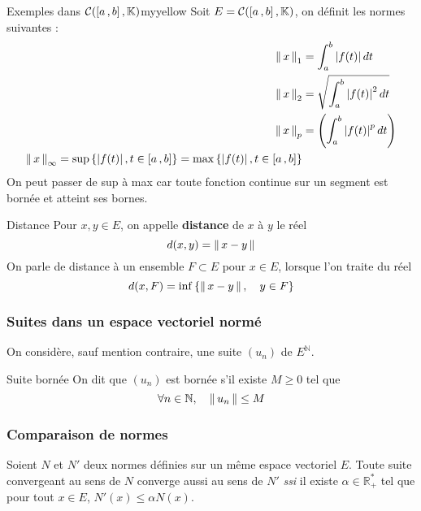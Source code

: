     \begin{omed}{Exemples dans $\mathcal{C}(\intervalleFF{a}{b},\mathbb{K})$}{myyellow}
        Soit $E = \mathcal{C}(\intervalleFF{a}{b}, \mathbb{K})$, on définit les normes suivantes :
        \begin{align*}
            \nnorm{1}{x} &= \int_{a}^{b} \abs{f(t)}dt \\
            \nnorm{2}{x} &= \sqrt{\int_{a}^{b} \abs{f(t)}^2 dt} \\
            \nnorm{p}{x} &= \left(\int_{a}^{b} \abs{f(t)}^p dt\right) \\
            \nnorm{\infty}{x} = \sup\left\{\abs{f(t)}, t \in \intervalleFF{a}{b}\right\} = \max\left\{\abs{f(t)}, t \in \intervalleFF{a}{b}\right\}
        \end{align*}
        On peut passer de sup à max car toute fonction continue sur un segment est bornée et atteint ses bornes.
    \end{omed}

    \begin{defi}{Distance}{}
        Pour $x,y \in E$, on appelle \textbf{distance} de $x$ à $y$ le réel 
        \[ d(x,y) = \norm{x-y} \]   
        On parle de distance à un ensemble $F \subset E$ pour $x \in E$, lorsque l’on traite du réel 
        \[ d(x,F) = \inf\left\{\norm{x-y}, \quad y \in F\right\} \]   
    \end{defi}

    \subsubsection{Suites dans un espace vectoriel normé}

    On considère, sauf mention contraire, une suite $(u_n)$ de $E^{\mathbb{N}}$.

    \begin{defi}{Suite bornée}{}
        On dit que $(u_n)$ est bornée s’il existe $M \geq 0$ tel que 
        \[ \forall n \in \mathbb{N}, \quad \norm{u_n} \leq M \]   
    \end{defi}

    \subsubsection{Comparaison de normes}

    \begin{prop}{}{}
        Soient $N$ et $N'$ deux normes définies sur un même espace vectoriel $E$. Toute suite convergeant au sens de $N$ converge aussi au sens de $N'$ \textit{ssi} il existe $\alpha \in \mathbb{R}_+^*$ tel que pour tout $x \in E$, $N'(x) \leq \alpha N(x)$.
    \end{prop}


